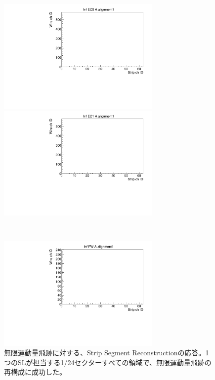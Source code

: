 \begin{figure}
    \begin{minipage}[b]{.5\linewidth}
        \centering
        \includegraphics[height=5.6cm]{fig/Test/A_InfEC0_strip.pdf}
    \end{minipage}
    \begin{minipage}[b]{.5\linewidth}
        \centering
        \includegraphics[height=5.6cm]{fig/Test/A_InfEC1_strip.pdf}
    \end{minipage}\\
    \begin{minipage}[b]{\linewidth}
        \centering
        \includegraphics[height=5.6cm]{fig/Test/A_InfFW_strip.pdf}
    \end{minipage}
    \caption[異なる画像形式の比較]{無限運動量飛跡に対する、Strip Segment Reconstructionの応答。1つのSLが担当する1/24セクターすべての領域で、無限運動量飛跡の再構成に成功した。}
    \label{Inf_A_Strip}
\end{figure}

